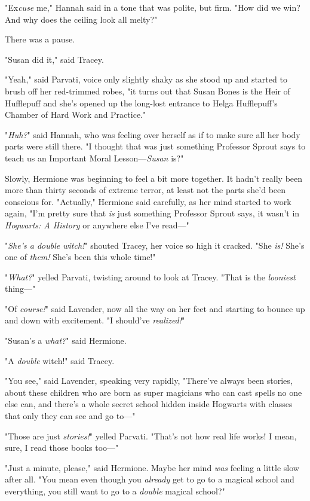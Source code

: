 "Ex\emph{cuse} me," Hannah said in a tone that was polite, but firm. "How did 
we win? And why does the ceiling look all melty?"

There was a pause.

"Susan did it," said Tracey.

"Yeah," said Parvati, voice only slightly shaky as she stood up and started to 
brush off her red-trimmed robes, "it turns out that Susan Bones is the Heir of 
Hufflepuff and she's opened up the long-lost entrance to Helga Hufflepuff's 
Chamber of Hard Work and Practice."

"\emph{Huh?}" said Hannah, who was feeling over herself as if to make sure all 
her body parts were still there. "I thought that was just something Professor 
Sprout says to teach us an Important Moral Lesson---\emph{Susan} is?"

Slowly, Hermione was beginning to feel a bit more together. It hadn't really 
been more than thirty seconds of extreme terror, at least not the parts she'd 
been conscious for. "Actually," Hermione said carefully, as her mind started to 
work again, "I'm pretty sure that \emph{is} just something Professor Sprout 
says, it wasn't in \emph{Hogwarts: A History} or anywhere else I've read---"

"\emph{She's a double witch!}" shouted Tracey, her voice so high it cracked. 
"She\emph{ is!} She's one of \emph{them!} She's been this whole time!"

"\emph{What?}" yelled Parvati, twisting around to look at Tracey. "That is the 
\emph{looniest} thing---"

"Of \emph{course!}" said Lavender, now all the way on her feet and starting to 
bounce up and down with excitement. "I should've\emph{ realized!}"

"Susan's a \emph{what?}" said Hermione.

"A \emph{double} witch!" said Tracey.

"You see," said Lavender, speaking very rapidly, "There've always been stories, 
about these children who are born as super magicians who can cast spells no one 
else can, and there's a whole secret school hidden inside Hogwarts with classes 
that only they can see and go to---"

"Those are just \emph{stories!}" yelled Parvati. "That's not how real life 
works! I mean, sure, I read those books too---"

"Just a minute, please," said Hermione. Maybe her mind \emph{was} feeling a 
little slow after all. "You mean even though you \emph{already} get to go to a 
magical school and everything, you still want to go to a \emph{double} magical 
school?"

